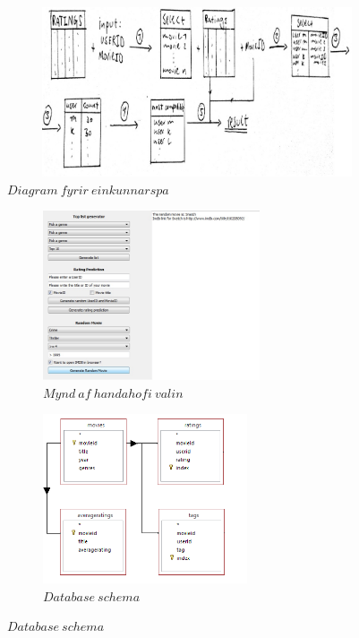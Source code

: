 \documentclass[11pt,a4paper]{amsart}
\theoremstyle{plain}
\theoremstyle{definition}
\theoremstyle{remark}
\begin{document}
\begin{figure}[H]
\centering
\includegraphics[height=50mm,width=16cm]{pre_dia.jpg}
\caption{$ Diagram\ fyrir\ einkunnarspa $\label{fig:pdia}}
\end{figure}
\vspace{2mm}

\begin{figure}[H]
	\centering
	\begin{subfigure}[b]{0.5\textwidth}
		\includegraphics[height=50mm]{rand.jpg}
		\caption{$ Mynd\ af\ handahofi\ valin $\label{fig:rad}}
	\end{subfigure}
	\begin{subfigure}[b]{0.4\textwidth}
		\includegraphics[height=50mm]{database_schema.png}
		\caption{$ Database\ schema $\label{fig:schema}}	
	\end{subfigure}
\end{figure}
\end{document}
